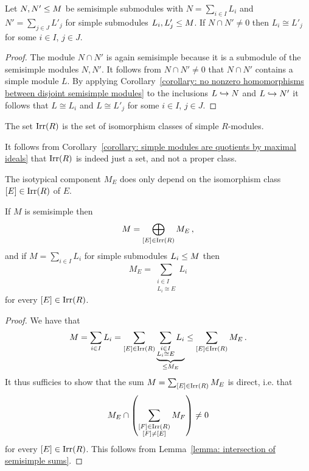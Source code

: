 



\begin{lemma}
  \label{lemma: intersection of semisimple sums}
  Let $N, N' \leq M$ be semisimple submodules with $N = \sum_{i \in I} L_i$ and $N' = \sum_{j \in J} L'_j$ for simple submodules $L_i, L'_j \leq M$.
  If $N \cap N' \neq 0$ then $L_i \cong L'_j$ for some $i \in I$, $j \in J$.
\end{lemma}


\begin{proof}
  The module $N \cap N'$ is again semisimple because it is a submodule of the semisimple modules $N, N'$.
  It follows from $N \cap N' \neq 0$ that $N \cap N'$ contains a simple module $L$.
  By applying Corollary~\ref{corollary: no nonzero homomorphisms between disjoint semisimple modules} to the inclusions $L \hookrightarrow N$ and $L \hookrightarrow N'$ it follows that $L \cong L_i$ and $L \cong L'_j$ for some $i \in I$, $j \in J$.
\end{proof}


\begin{definition}
  The set $\operatorname{Irr}(R)$ is the set of isomorphism classes of simple $R$-modules.
\end{definition}


\begin{remark}
  It follows from Corollary~\ref{corollary: simple modules are quotients by maximal ideals} that $\operatorname{Irr}(R)$ is indeed just a set, and not a proper class.
\end{remark}


\begin{remark}
  The isotypical component $M_E$ does only depend on the isomorphism class $[E] \in \operatorname{Irr}(R)$ of $E$.
\end{remark}


\begin{theorem}
  \label{theorem: isotypical decomposition}
  If $M$ is semisimple then
  \[
      M
    = \bigoplus_{[E] \in \operatorname{Irr}(R)} M_E \,,
  \]
  and if $M = \sum_{i \in I} L_i$ for simple submodules $L_i \leq M$ then
  \[
      M_E
    = \sum_{\substack{i \in I \\ L_i \cong E}} L_i
  \]
  for every $[E] \in \operatorname{Irr}(R)$.
\end{theorem}


\begin{proof}
  We have that
  \[
              M
    =         \sum_{i \in I} L_i
    =         \sum_{[E] \in \operatorname{Irr}(R)}
              \underbrace{
                \sum_{\substack{i \in I \\ L_i \cong E}} L_i
              }_{\leq M_E}
    \leq \sum_{[E] \in \operatorname{Irr}(R)} M_E \,.
  \]
  It thus sufficies to show that the sum $M  = \sum_{[E] \in \operatorname{Irr}(R)} M_E$ is direct, i.e. that
  \[
          M_E
          \cap 
          \left(
            \sum_{\substack{[F] \in \operatorname{Irr}(R) \\ [F] \neq [E]}} M_F
          \right)
    \neq  0
  \]
  for every $[E] \in \operatorname{Irr}(R)$.
  This follows from Lemma~\ref{lemma: intersection of semisimple sums}.
\end{proof}


